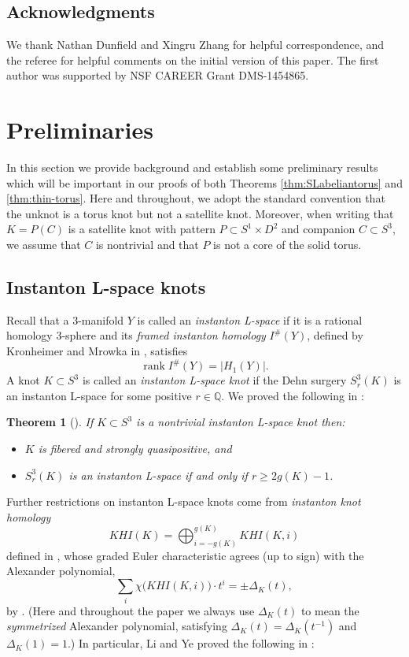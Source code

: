 \documentclass[11pt]{amsart}
\newtheorem {theorem}{Theorem}
\numberwithin{equation}{section}
\numberwithin{theorem}{section}
\theoremstyle{definition}
\newcommand{\Q}{\mathbb{Q}}
\newcommand\KHI{\mathit{KHI}}
\newcommand\Is{I^\#}
\begin{document}
\subsection{Acknowledgments} We thank Nathan Dunfield and Xingru Zhang for helpful correspondence, and the referee for helpful comments on the initial version of this paper. The first author was supported by NSF CAREER Grant DMS-1454865.

%
%
%
%
%

\section{Preliminaries}\label{sec:prelim}

In this section we provide  background  and establish some preliminary results which will be important in our proofs of both Theorems \ref{thm:SLabeliantorus} and \ref{thm:thin-torus}. Here and throughout, we adopt the standard convention that the unknot is a torus knot but  not a satellite knot. Moreover, when writing that $K=P(C)$ is a satellite knot with pattern $P\subset S^1\times D^2$ and companion $C\subset S^3$, we assume that $C$ is nontrivial and that $P$ is not a core of the solid torus.

\subsection{Instanton L-space knots} Recall that a  3-manifold $Y$ is called an \emph{instanton L-space} if it is a rational homology 3-sphere and its \emph{framed instanton homology} $\Is(Y)$,  defined by Kronheimer and Mrowka in \cite{km-yaft}, satisfies \[\operatorname{rank}\Is(Y) = |H_1(Y)|.\] A knot $K\subset S^3$ is called an \emph{instanton L-space knot} if the Dehn surgery  $S^3_r(K)$ is an instanton L-space for some positive $r\in\Q$. We proved the following in {\cite[Theorem~1.15]{bs-lspace}}:

\begin{theorem}[] \label{thm:bs-lspace}
If $K \subset S^3$ is a nontrivial instanton L-space knot then:
\begin{itemize}
\item $K$ is fibered and strongly quasipositive, and 
\item $S^3_r(K)$ is an instanton L-space  if and only if $r \geq 2g(K)-1$.
\end{itemize}
\end{theorem}

\noindent Further restrictions on instanton L-space knots come from  \emph{instanton knot homology}
\[ \KHI(K) = \bigoplus_{i=-g(K)}^{g(K)} \KHI(K,i) \]
defined in \cite{km-excision}, whose graded Euler characteristic agrees (up to sign) with the Alexander polynomial, \[\sum_i \chi\big(\KHI(K,i)\big)\cdot t^i=\pm \Delta_K(t),\]  by \cite{km-alexander,lim}.  (Here and throughout the paper we always use $\Delta_K(t)$ to mean the \emph{symmetrized} Alexander polynomial, satisfying $\Delta_K(t) = \Delta_K(t^{-1})$ and $\Delta_K(1)=1$.)  In particular, Li and Ye proved the following in {\cite[Theorem~1.9]{li-ye-surgery}}:
\end{document}
